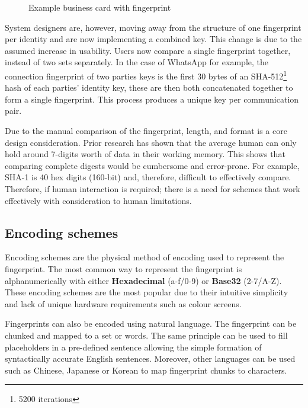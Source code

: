 \begin{figure}[h!]
    \centering
    \fbox{
        
    }
    \caption{Example business card with fingerprint}
    \label{fig:businessCard}
\end{figure}

System designers are, however, moving away from the structure of one fingerprint per identity and are now implementing a combined key. This change is due to the assumed increase in usability. Users now compare a single fingerprint together, instead of two sets separately. In the case of WhatsApp for example, the connection fingerprint of two parties keys is the first 30 bytes of an SHA-512\footnote{5200 iterations} hash of each parties' identity key, these are then both concatenated together to form a single fingerprint\cite{whatsapp2017paper}. This process produces a unique key per communication pair.

Due to the manual comparison of the fingerprint, length, and format is a core design consideration. Prior research has shown that the average human can only hold around 7-digits worth of data in their working memory\cite{miller1956magical}. This shows that comparing complete digests would be cumbersome and error-prone. For example, SHA-1 is 40 hex digits (160-bit) and, therefore, difficult to effectively compare. Therefore, if human interaction is required; there is a need for schemes that work effectively with consideration to human limitations.

\newpage

\subsection{Encoding schemes}
\label{sec:encodingSchemes}
Encoding schemes are the physical method of encoding used to represent the fingerprint. The most common way to represent the fingerprint is alphanumerically with either \textbf{Hexadecimal} (a-f/0-9) or \textbf{Base32} (2-7/A-Z). These encoding schemes are the most popular due to their intuitive simplicity and lack of unique hardware requirements such as colour screens.

Fingerprints can also be encoded using natural language. The fingerprint can be chunked and mapped to a set or words. The same principle can be used to fill placeholders in a pre-defined sentence allowing the simple formation of syntactically accurate English sentences. Moreover, other languages can be used such as Chinese, Japanese or Korean to map fingerprint chunks to characters.

